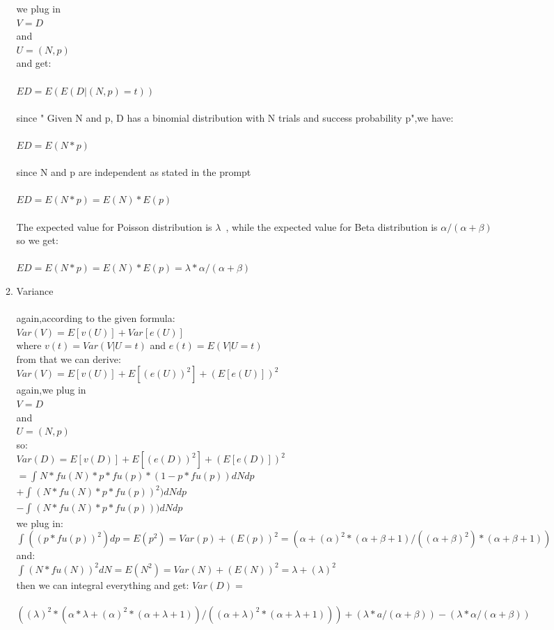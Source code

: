 \documentclass{amsart}
\begin{document}
\begin{enumerate}
\begin{enumerate}
we plug in \\$V = D $\\and \\$U = (N,p)$\\
and get:\\
\\$ED = E(E(D|(N,p)=t))$\\\\
since " Given N and p, D has a binomial distribution with N trials and success probability p",we have:\\
\\$ED = E(N*p)$\\\\
since N and p are independent as stated in the prompt\\
\\$ED = E(N*p)=E(N)*E(p)$\\\\
The expected value for Poisson distribution is $\lambda$\ , while the expected value for Beta distribution is $\alpha / (\alpha + \beta)$\\
so we get:\\
\\$ED = E(N*p)=E(N)*E(p)=\lambda*\alpha / (\alpha + \beta)$
\item Variance\\\\
again,according to the given formula:\\
$Var(V) = E[v(U)] + Var[e(U)]$\\
where $v(t) = Var(V | U = t)$ and $e(t) = E(V | U = t) $\\
from that we can derive:\\
$Var(V)= E[v(U)] + E[(e(U))^2] + (E[e(U)])^2$\\
again,we plug in \\$V = D $\\and \\$U = (N,p)$\\
so:\\
$Var(D)= E[v(D)] + E[(e(D))^2] + (E[e(D)])^2$\\
$=\int_{}^{} N *fu(N) * p * fu(p) * (1 - p * fu(p))dNdp$\\
$+\int_{}^{} (N *fu(N) * p * fu(p))^2 )dNdp$\\
$-\int_{}^{} (N *fu(N) * p * fu(p)) )dNdp$\\
we plug in:\\
$\int_{}^{}((p*fu(p))^2)dp = E(p^2) = Var(p) + (E(p))^2 = (\alpha+(\alpha)^2*(\alpha+\beta+1)/((\alpha+\beta)^2)*(\alpha+\beta+1))$\\
and:\\
$\int_{}^{}(N*fu(N))^2dN = E(N^2)=Var(N)+(E(N))^2=\lambda + (\lambda)^2$\\
then we can integral everything and get:
$Var(D)= $\\
\\$((\lambda)^2*(\alpha*\lambda+(\alpha)^2*(\alpha+\lambda+1))/((\alpha+\lambda)^2*(\alpha+\lambda+1)))+(\lambda*a/(\alpha+\beta))-(\lambda*\alpha/(\alpha+\beta))$\\

\end{enumerate}
\end{enumerate}
\end{document}
